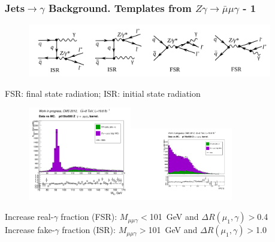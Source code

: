 \begin{frame}\frametitle{Jets$\rightarrow \gamma$ Background. Templates from $Z\gamma\rightarrow{\bar{\mu}}\mu\gamma$ - 1}

  \begin{figure}[htb]
      \begin{center}
        \scriptsize
          \includegraphics[width=0.95\textwidth]{../figs/ForPresentation/feynmZg_LO.png}
       \end{center}
    \end{figure}

\scriptsize
FSR: final state radiation; ISR: initial state radiation

  \begin{figure}[htb]
    \begin{center}
       \includegraphics[width=0.40\textwidth]{../figs/figs_v11/MUON_ZGamma/PrepareYields/c_TotalDATAvsMC_Barrel__MpholeplepVERY_PRELIMINARY_pt15to500_.png}\includegraphics[width=0.40\textwidth]{../figs/figs_v11/MUON_ZGamma/PrepareYields/c_TotalDATAvsMC_Barrel__lep1PhoDeltaRVERY_PRELIMINARY_pt15to500_.pdf}\\
    \end{center}
  \end{figure}
\scriptsize
Increase real-$\gamma$ fraction (FSR): $M_{\mu\mu\gamma}<$101~GeV and $\Delta R(\mu_{1},\gamma)>$0.4\\
Increase fake-$\gamma$ fraction (ISR): $M_{\mu\mu\gamma}>$101~GeV and $\Delta R(\mu_{1},\gamma)>$1.0

\end{frame}%

